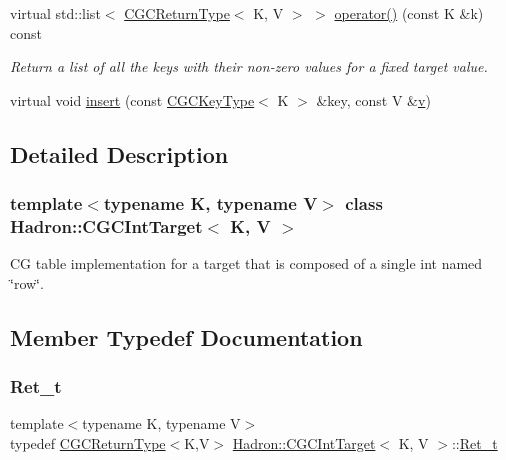 \begin{DoxyCompactItemize}
virtual std\+::list$<$ \mbox{\hyperlink{structHadron_1_1CGCReturnType}{C\+G\+C\+Return\+Type}}$<$ K, V $>$ $>$ \mbox{\hyperlink{classHadron_1_1CGCIntTarget_a5946627ddb796961b97b7e0c57e32d83}{operator()}} (const K \&k) const
\begin{DoxyCompactList}\small\item\em Return a list of all the keys with their non-\/zero values for a fixed target value. \end{DoxyCompactList}\item 
virtual void \mbox{\hyperlink{classHadron_1_1CGCIntTarget_a2c1e2eaf068abdc394ba3326c7770e77}{insert}} (const \mbox{\hyperlink{structHadron_1_1CGCKeyType}{C\+G\+C\+Key\+Type}}$<$ K $>$ \&key, const V \&\mbox{\hyperlink{hadron__timeslice_8cc_a716fc87f5e814be3ceee2405ed6ff22a}{v}})
\end{DoxyCompactItemize}


\subsection{Detailed Description}
\subsubsection*{template$<$typename K, typename V$>$\newline
class Hadron\+::\+C\+G\+C\+Int\+Target$<$ K, V $>$}

CG table implementation for a target that is composed of a single int named \char`\"{}row\char`\"{}. 

\subsection{Member Typedef Documentation}
\mbox{\label{classHadron_1_1CGCIntTarget_a3436ab6591c4722808ea25ced7b18c46}} 
\subsubsection{\texorpdfstring{Ret\_t}{Ret\_t}\hspace{0.1cm}{\footnotesize\ttfamily [1/2]}}
{\footnotesize\ttfamily template$<$typename K, typename V$>$ \\
typedef \mbox{\hyperlink{structHadron_1_1CGCReturnType}{C\+G\+C\+Return\+Type}}$<$K,V$>$ \mbox{\hyperlink{classHadron_1_1CGCIntTarget}{Hadron\+::\+C\+G\+C\+Int\+Target}}$<$ K, V $>$\+::\mbox{\hyperlink{classHadron_1_1CGCIntTarget_a3436ab6591c4722808ea25ced7b18c46}{Ret\+\_\+t}}}

